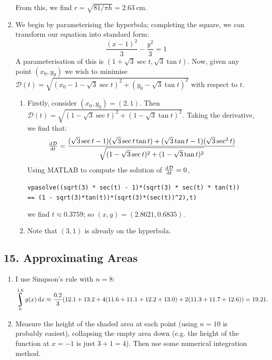 \begin{enumerate}
\begin{displaymath}
        \end{displaymath}
        From this, we find $ r = \sqrt{81/\pi h} = \SI{2.63}{\centi\metre} $.
  \item We begin by parameterising the hyperbola; completing the square, we can transform our equation into standard form:
        \begin{displaymath}
          \frac{(x - 1)^2}{3}  - \frac{y^2}{3} = 1
        \end{displaymath}
        A parameterisation of this is $ (1 + \sqrt{3} \sec t, \sqrt{3} \tan t) $. Now, given any point $ (x_0, y_0) $ we wish
        to minimise $ \mathcal{D}(t) = \sqrt{(x_0 - 1 - \sqrt{3} \sec t)^2 + (y_0 - \sqrt{3} \tan t)^2} $ with respect to $ t $.

        \begin{enumerate}
          \item Firstly, consider $ (x_0, y_0) = (2,1) $. Then $ \mathcal{D}(t) = \sqrt{(1 - \sqrt{3}\sec t)^2 + (1 - \sqrt{3} \tan t)^2} $.
                Taking the derivative, we find that:
                \begin{displaymath}
                  \od{\mathcal{D}}{t} = \frac{(\sqrt{3}\sec t - 1)(\sqrt{3}\sec t \tan t) + (\sqrt{3}\tan t - 1)(\sqrt{3}\sec^2 t)}{\sqrt{(1 - \sqrt{3}\sec t)^2 + (1 - \sqrt{3} \tan t)^2}}
                \end{displaymath}
                Using MATLAB to compute the solution of $ \od{\mathcal{D}}{t} = 0 $,
                \begin{center}
                  \verb|vpasolve((sqrt(3) * sec(t) - 1)*(sqrt(3) * sec(t) * tan(t))|\\
                  \qquad\verb|== (1 - sqrt(3)*tan(t))*(sqrt(3)*(sec(t))^2),t)|
                \end{center}
                we find $ t \approx 0.3759 $; so $ (x, y) = (2.8621, 0.6835) $.
            \item Note that $ (3,1) $ is already on the hyperbola. \Innocey
        \end{enumerate}
\end{enumerate}

\subsection*{15. Approximating Areas}
\begin{enumerate}
  \item I use Simpson's rule with $ n = 8 $:
        \begin{displaymath}
          \rint^{1.6}_0 g(x) \dif{x} \approx \frac{0.2}{3} (12.1 + 13.2 + 4(11.6 + 11.1 + 12.2 + 13.0) + 2(11.3 + 11.7 + 12.6)) = 19.21.
        \end{displaymath}
  \item Measure the height of the shaded area at each point (using $ n = 10 $ is probably easiest), collapsing the empty area down (e.g. the height
        of the function at $ x = -1 $ is just $ 3 + 1 = 4 $). Then use some numerical integration method.
\end{enumerate}

